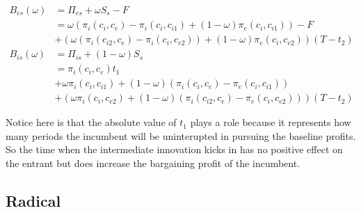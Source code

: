 
\begin{align*}
B_{es}(\omega) &= \Pi_{es}+ \omega S_s -F \\
&=\omega(\pi_i(c_i,c_{e})-\pi_i(c_i,c_{i1})+(1-\omega)\pi_e(c_i,c_{i1}))-F \\
&+(\omega(\pi_i(c_{i2},c_e)- \pi_i(c_{i},c_{e2}))+(1-\omega)\pi_e(c_{i},c_{e2}))(T-t_2) \\
B_{is}(\omega) &= \Pi_{is}+(1-\omega)S_s \\
& =\pi_i(c_i,c_{e})t_1 \\
&+\omega \pi_i(c_i,c_{i1})+(1-\omega)(\pi_i(c_i,c_{e})-\pi_e(c_i,c_{i1}))
\\&+(\omega \pi_i(c_i,c_{e2})+(1-\omega)(\pi_i(c_{i2},c_e)-\pi_e(c_{i},c_{e2})))(T-t_2)
\end{align*}

Notice here is that the absolute value of $t_1$ plays a role because it represents how many periods the incumbent will be uninterupted in pursuing the baseline profits. So the time when the intermediate innovation kicks in has no positive effect on the entrant but does increase the bargaining profit of the incumbent. 

\subsection{Radical}

